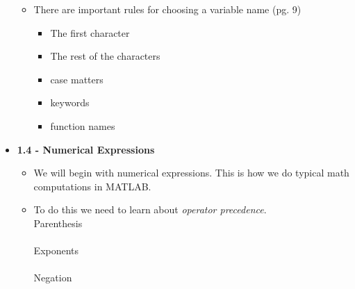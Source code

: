 \documentclass[11pt]{article}
\begin{document}
\begin{itemize}
\begin{itemize}
		\scalebox{2}{$variable = expression$}	\vspace{50mm}

		
		\newpage
			\item  \Large{There are important rules for choosing a variable name (pg. 9)} \\
				\begin{itemize}
					
					\item The first character  \vspace{35mm}

					\item The rest of the characters  \vspace{35mm}

					\item case matters \vspace{35mm}
					
					\item keywords \vspace{35mm}

					\item function names
				

				\end{itemize}


		\end{itemize}
	\newpage
	\item \textbf{ \LARGE 1.4 - Numerical Expressions}
		\begin{itemize}
			\item \Large{We will begin with numerical expressions. This is how we do typical math computations in MATLAB.} \vspace{10mm}

			\item To do this we need to learn about {\it operator precedence}. \\


				\scalebox{2}{$(\hspace{3mm} )$} \hspace{15mm}\Large{Parenthesis} \\\\

				\scalebox{2}{$\wedge$} \hspace{15mm}\Large{Exponents} \\\\

				\scalebox{2}{$-$} \hspace{15mm}\Large{Negation} \\\\


\end{itemize}
\end{itemize}
\end{document}
